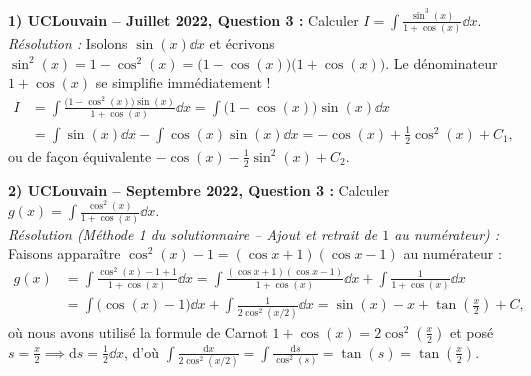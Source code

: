 \begin{exemple}
\textbf{1) UCLouvain -- Juillet 2022, Question 3 :} Calculer $I = \displaystyle\int \frac{\sin^3(x)}{1 + \cos(x)}\dd x$.\\
\emph{Résolution :} Isolons $\sin(x)\dd x$ et écrivons $\sin^2(x) = 1 - \cos^2(x) = \bigl(1 - \cos(x)\bigr)\bigl(1 + \cos(x)\bigr)$. Le dénominateur $1 + \cos(x)$ se simplifie immédiatement !
\begin{align*}
    I &= \int \frac{\bigl(1 - \cos^2(x)\bigr)\sin(x)}{1 + \cos(x)}\dd x = \int \bigl(1 - \cos(x)\bigr)\sin(x)\dd x \\
    &= \int \sin(x)\dd x - \int \cos(x)\sin(x)\dd x = \boxed{-\cos(x) + \frac{1}{2}\cos^2(x) + C_1},
\end{align*}
ou de façon équivalente $-\cos(x) - \frac{1}{2}\sin^2(x) + C_2$.

\medskip
\textbf{2) UCLouvain -- Septembre 2022, Question 3 :} Calculer $g(x) = \displaystyle\int \frac{\cos^2(x)}{1 + \cos(x)}\dd x$.\\
\emph{Résolution (Méthode 1 du solutionnaire -- Ajout et retrait de $1$ au numérateur) :}
Faisons apparaître $\cos^2(x) - 1 = (\cos x + 1)(\cos x - 1)$ au numérateur :
\begin{align*}
    g(x) &= \int \frac{\cos^2(x) - 1 + 1}{1 + \cos(x)}\dd x = \int \frac{(\cos x + 1)(\cos x - 1)}{1 + \cos(x)}\dd x + \int \frac{1}{1 + \cos(x)}\dd x \\
    &= \int \bigl(\cos(x) - 1\bigr)\dd x + \int \frac{1}{2\cos^2(x/2)}\dd x = \boxed{\sin(x) - x + \tan\left(\frac{x}{2}\right) + C},
\end{align*}
où nous avons utilisé la formule de Carnot $1 + \cos(x) = 2\cos^2\left(\frac{x}{2}\right)$ et posé $s = \frac{x}{2} \implies \mathrm{d}s = \frac{1}{2}\dd x$, d'où $\int \frac{\mathrm{d}x}{2\cos^2(x/2)} = \int \frac{\mathrm{d}s}{\cos^2(s)} = \tan(s) = \tan\left(\frac{x}{2}\right)$.


\end{exemple}
